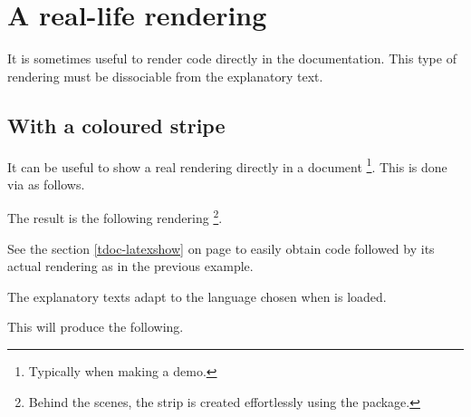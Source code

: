 \documentclass[10pt, a4paper]{article}
\begin{document}
\section{A real-life rendering} \label{tdoc-showcase}

It is sometimes useful to render code directly in the documentation. This type of rendering must be dissociable from the explanatory text.




\subsection{With a coloured stripe}

\begin{tdocexa} 
    It can be useful to show a real rendering directly in a document
    \footnote{
        Typically when making a demo.
    }.
    This is done via  as follows.


    The result is the following rendering
    \footnote{
        Behind the scenes, the strip is created effortlessly using the  package.
    }.

    \medskip

    
\end{tdocexa}


\begin{tdocrem}
    See the section \ref{tdoc-latexshow} on page \pageref{tdoc-latexshow} to easily obtain code followed by its actual rendering as in the previous example.
\end{tdocrem}


\begin{tdocnote}
    The explanatory texts adapt to the language chosen when  is loaded.
\end{tdocnote}




\begin{tdocexa}
    \leavevmode


    This will produce the following.

    \medskip

    
\end{tdocexa}
\end{document}
